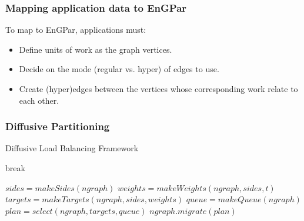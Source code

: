 \documentclass[aspectratio=169]{beamer}
\begin{document}
\begin{frame}
  \frametitle{Mapping application data to EnGPar}
  To map to EnGPar, applications must:
  \begin{itemize}
  \item Define units of work as the graph vertices.
  \item Decide on the mode (regular vs. hyper) of edges to use.
  \item Create (hyper)edges between the vertices whose corresponding work relate to each other.
  \end{itemize}
\end{frame}


\begin{frame}
  \frametitle{Diffusive Partitioning}
  \begin{algorithm}[H]
    \caption{Diffusive Load Balancing Framework}
    \label{alg:engpar}
    \small
    \begin{algorithmic}[1]
      \State break
      \EndIf
      \EndWhile
      \EndFor
      \EndProcedure

      \State $sides = makeSides(ngraph)$
      \State $weights = makeWeights(ngraph,sides,t)$
      \State $targets = makeTargets(ngraph,sides,weights)$
      \State $queue = makeQueue(ngraph)$
      \State $plan = select(ngraph,targets,queue)$
      \State $ngraph.migrate(plan)$
      \EndProcedure
    \end{algorithmic}
  \end{algorithm}
\end{frame}
\end{document}
